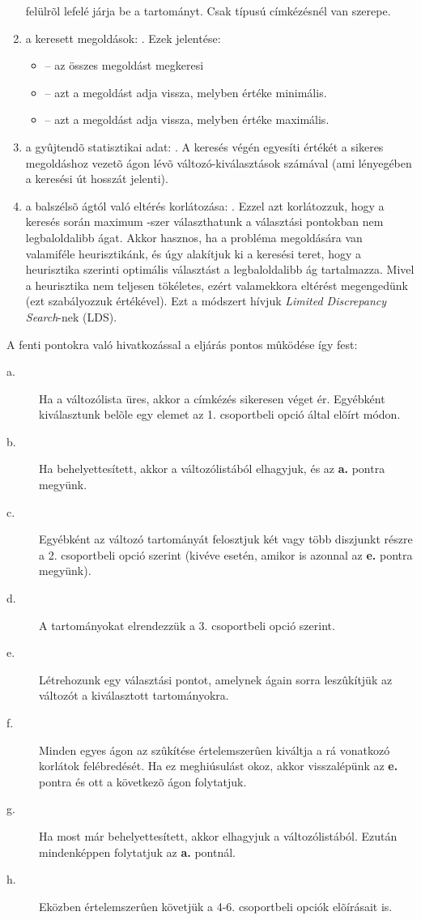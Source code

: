 \begin{enumerate}
 felülrõl lefelé járja be a tartományt. Csak  típusú
címkézésnél van szerepe.
\item a keresett megoldások: . Ezek jelentése:
	\begin{itemize}
	\item {} -- az összes megoldást megkeresi
	\item {} -- azt a megoldást adja vissza, melyben  értéke
	minimális.
	\item {} -- azt a megoldást adja vissza, melyben  értéke
	maximális.
	\end{itemize}
\item a gyûjtendõ statisztikai adat: . A keresés végén egyesíti
 értékét a sikeres megoldáshoz vezetõ ágon lévõ változó-kiválasztások
számával (ami lényegében a keresési út hosszát jelenti).
\item a balszélsõ ágtól való eltérés korlátozása: . Ezzel azt
korlátozzuk, hogy a keresés során maximum -szer választhatunk a választási
pontokban nem legbaloldalibb ágat. Akkor hasznos, ha a probléma megoldására van
valamiféle heurisztikánk, és úgy alakítjuk ki a keresési teret, hogy a heurisztika
szerinti optimális választást a legbaloldalibb ág tartalmazza. Mivel a heurisztika
nem teljesen tökéletes, ezért valamekkora eltérést megengedünk (ezt szabályozzuk
 értékével). Ezt a módszert hívjuk \emph{Limited Discrepancy Search}-nek (LDS).
\end{enumerate}

A fenti pontokra való hivatkozással a  eljárás pontos mûködése
így fest:

\label{labeling:lepesek}
\begin{description}
\item[a.]  Ha a változólista üres, akkor a címkézés sikeresen véget
ér. Egyébként kiválasztunk belõle egy  elemet az 1. csoportbeli opció
által elõírt módon.
\item[b.] Ha  behelyettesített, akkor a változólistából elhagyjuk, és az
{\bf a.} pontra megyünk.
\item[c.] Egyébként az  változó tartományát felosztjuk két vagy több
diszjunkt részre a 2. csoportbeli opció szerint (kivéve 
esetén, amikor is azonnal az {\bf e.} pontra megyünk).
\item[d.] A tartományokat elrendezzük a 3. csoportbeli opció szerint.
\item[e.] Létrehozunk egy választási pontot, amelynek ágain sorra
leszûkítjük az  változót a kiválasztott tartományokra.
\item[f.] Minden egyes ágon az  szûkítése értelemszerûen kiváltja a
rá vonatkozó korlátok felébredését. Ha ez meghiúsulást okoz, akkor
visszalépünk az {\bf e.} pontra és ott a következõ ágon folytatjuk.
\item[g.] Ha  most már behelyettesített, akkor elhagyjuk a változólistából.
Ezután mindenképpen folytatjuk az {\bf a.} pontnál.
\item[h.] Eközben értelemszerûen követjük a 4-6. csoportbeli opciók elõírásait is.
\end{description}

